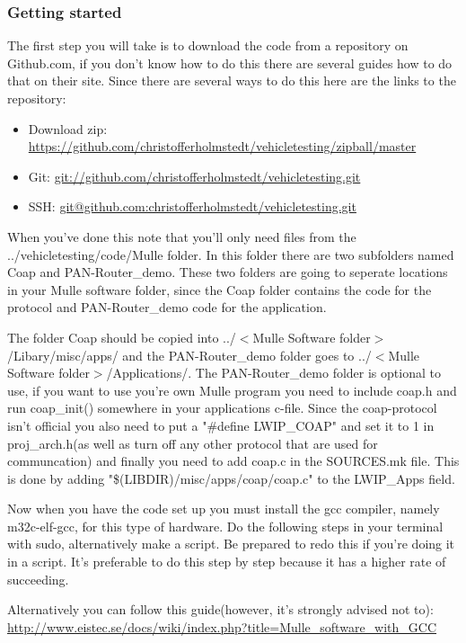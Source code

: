 \subsubsection{Getting started}
The first step you will take is to download the code from a repository on Github.com, if you don't know how to do this there are several guides how to do that on their site. Since there are several ways to do this here are the links to the repository:
\begin{itemize}
\item Download zip: \url{https://github.com/christofferholmstedt/vehicletesting/zipball/master}
\item Git: \url{git://github.com/christofferholmstedt/vehicletesting.git}
\item SSH: \url{git@github.com:christofferholmstedt/vehicletesting.git}
\end{itemize}
When you've done this note that you'll only need files from the ../vehicletesting/code/Mulle folder.
In this folder there are two subfolders named Coap and PAN-Router\_demo. 
These two folders are going to seperate locations in your Mulle software folder, 
since the Coap folder contains the code for the protocol and PAN-Router\_demo code for the application. 

The folder Coap should be copied into ../$<$Mulle Software folder$>$/Libary/misc/apps/ 
and the PAN-Router\_demo folder goes to  ../$<$Mulle Software folder$>$/Applications/. 
The PAN-Router\_demo folder is optional to use, if you want to use you're own Mulle program you need to include coap.h and run coap\_init() somewhere in your applications c-file. 
Since the coap-protocol isn't official you also need to put a "\#define LWIP\_COAP" and set it to 1 in proj\_arch.h(as well as turn off any other protocol that are used for communcation) 
and finally you need to add coap.c in the SOURCES.mk file. This is done by adding "\$(LIBDIR)/misc/apps/coap/coap.c" to the LWIP\_Apps field.

Now when you have the code set up you must install the gcc compiler, namely m32c-elf-gcc, for this type of hardware. Do the following steps in your terminal with sudo, alternatively make a script. Be prepared to redo this if you're doing it in a script. It's preferable to do this step by step because it has a higher rate of succeeding. 

Alternatively you can follow this guide(however, it's strongly advised not to): \url{http://www.eistec.se/docs/wiki/index.php?title=Mulle\_software\_with\_GCC}

